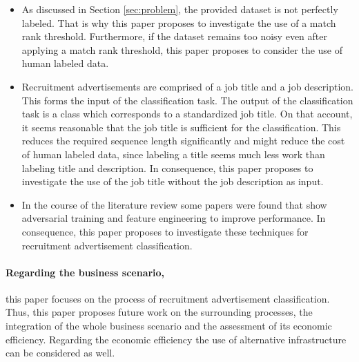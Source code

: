 \begin{itemize}
	\item As discussed in Section \ref{sec:problem}, the provided dataset is not perfectly labeled. That is why this paper proposes to investigate the use of a match rank threshold. Furthermore, if the dataset remains too noisy even after applying a match rank threshold, this paper proposes to consider the use of human labeled data.
	\item Recruitment advertisements are comprised of a job title and a job description. This forms the input of the classification task. The output of the classification task is a class which corresponds to a standardized job title. On that account, it seems reasonable that the job title is sufficient for the classification. This reduces the required sequence length significantly and might reduce the cost of human labeled data, since labeling a title seems much less work than labeling title and description. In consequence, this paper proposes to investigate the use of the job title without the job description as input.
	\item In the course of the literature review some papers were found that show adversarial training and feature engineering to improve performance.
	\autocites{CamachoCollados.2017}{Lenc.2017}{Amin.2018}{Asim.2019}{Lyubinets.2018}{Zhang.2015}{Miyato.2017}{Goodfellow.2015}
	In consequence, this paper proposes to investigate these techniques for recruitment advertisement classification.
\end{itemize}
\paragraph{Regarding the business scenario,} this paper focuses on the process of recruitment advertisement classification. Thus, this paper proposes future work on the surrounding processes, the integration of the whole business scenario and the assessment of its economic efficiency. Regarding the economic efficiency the use of alternative infrastructure can be considered as well.